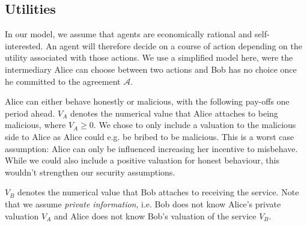 \documentclass[runningheads]{llncs}
\newcommand{\sys}{Promise\xspace}
\newcommand{\rk}[1]{\todo[linecolor=red,backgroundcolor=red!25,bordercolor=blue,inline,caption={}]{Comment by Rami: #1}}
\newcommand{\dom}[1]{\todo[linecolor=green,backgroundcolor=green!25,bordercolor=green,inline,caption={}]{Comment by Dominik: #1}}
\begin{document}



\subsection{Utilities}
In our model, we assume that agents are economically rational and self-interested.
An agent will therefore decide on a course of action depending on the utility associated with those actions.
We use a simplified model here, were the intermediary Alice can choose between two actions and Bob has no choice once he committed to the agreement $\mathcal{A}$.

Alice can either behave honestly or malicious, with the following pay-offs one period ahead.
$V_A$ denotes the numerical value that Alice attaches to being malicious, where $V_A \geq 0$.
We chose to only include a valuation to the malicious side to Alice as Alice could e.g. be bribed to be malicious.
This is a worst case assumption: Alice can only be influenced increasing her incentive to misbehave.
While we could also include a positive valuation for honest behaviour, this wouldn't strengthen our security assumptions.

$V_B$ denotes the numerical value that Bob attaches to receiving the service.
Note that we assume \emph{private information}, i.e. Bob does not know Alice's private valuation $V_A$ and Alice does not know Bob's valuation of the service $V_B$.
\end{document}
